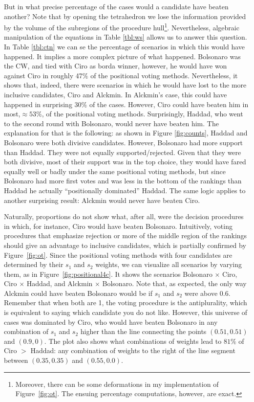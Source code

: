\documentclass[hidelinks,11pt]{article}
\begin{document}
But in what precise percentage of the cases would a candidate have beaten
another? Note that by opening the tetrahedron we lose the information provided
by the volume of the subregions of the procedure hull\footnote{Moreover, there
  can be some deformations in my implementation of Figure~\ref{fig:ot}. The
  ensuing percentage computations, however, are exact.}. Nevertheless, algebraic
manipulation of the equations in Table \ref{tbl:ws} allows us to answer this
question. In Table \ref{tbl:ctn} we can se the percentage of scenarios in which
this would have happened. It implies a more complex picture of what happened.
Bolsonaro was the CW, and tied with Ciro as borda winner, however,
he would have won against Ciro in roughly 47\(\%\) of the positional voting
methods. Nevertheless, it shows that, indeed, there were scenarios in which he
would have lost to the more inclusive candidates, Ciro and Alckmin. In Alckmin's
case, this could have happened in surprising \(30\%\) of the cases. However,
Ciro could have beaten him in most,\(\approx 53\%\), of the positional voting
methods. Surprisingly, Haddad, who went to the second round with Bolsonaro,
would never have beaten him. The explanation for that is the following: as shown
in Figure \ref{fig:counts}, Haddad and Bolsonaro were both divisive candidates.
However, Bolsonaro had more support than Haddad. They were not equally
supported/rejected. Given that they were both divisive, most of their support
was in the top choice, they would have fared equally well or badly under the
same positional voting methods, but since Bolsonaro had more first votes and was
less in the bottom of the rankings than Haddad he actually ``positionally
dominated'' Haddad. The same logic applies to another surprising result: Alckmin
would never have beaten Ciro.



Naturally, proportions do not show what, after all, were the decision procedures
in which, for instance, Ciro would have beaten Bolsonaro. Intuitively, voting
procedures that emphasize rejection or more of the middle region of the rankings
should give an advantage to inclusive candidates, which is partially confirmed
by Figure~\ref{fig:ot}. Since the positional voting methods with four candidates
are determined by their \(s_{1}\) and \(s_{2}\) weights, we can visualize all
scenarios by varying them, as in Figure~\ref{fig:positional4c}. It shows the
scenarios Bolsonaro \(\times\) Ciro, Ciro \(\times \) Haddad, and Alckmin
\(\times\) Bolsonaro. Note that, as expected, the only way Alckmin could have
beaten Bolsonaro would be if \(s_{1}\) and \(s_{2}\) were above 0.6. Remember
that when both are 1, the voting procedure is the antiplurality, which is
equivalent to saying which candidate you do not like. However, this universe of
cases was dominated by Ciro, who would have beaten Bolsonaro in any combination
of \(s_{1}\) and \(s_{2}\) higher than the line connecting the points
\((0.51,0.51)\) and \((0.9,0)\). The plot also shows what combinations of
weights lead to \(81\%\)
of Ciro \(>\) Haddad: any combination of weights to the right of the line
segment between \((0.35,0.35)\) and \((0.55,0.0)\).
\end{document}
